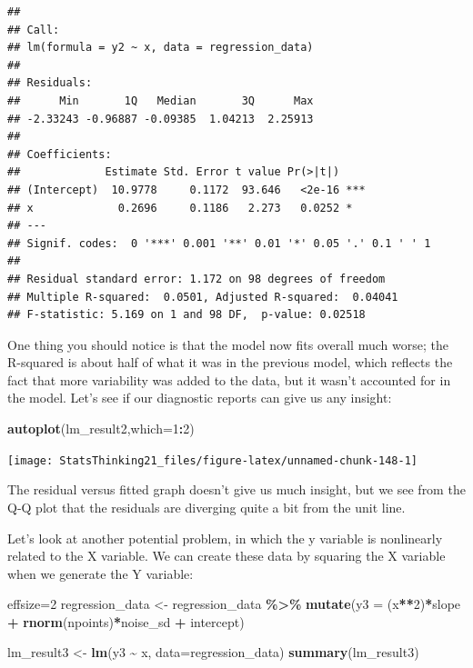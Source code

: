 \documentclass[
  12pt,
]{book}
\newenvironment{Shaded}{\begin{snugshade}}{\end{snugshade}}
\newcommand{\AttributeTok}[1]{\textcolor[rgb]{0.13,0.29,0.53}{#1}}
\newcommand{\DecValTok}[1]{\textcolor[rgb]{0.00,0.00,0.81}{#1}}
\newcommand{\FunctionTok}[1]{\textcolor[rgb]{0.13,0.29,0.53}{\textbf{#1}}}
\newcommand{\NormalTok}[1]{#1}
\newcommand{\OtherTok}[1]{\textcolor[rgb]{0.56,0.35,0.01}{#1}}
\newcommand{\SpecialCharTok}[1]{\textcolor[rgb]{0.81,0.36,0.00}{\textbf{#1}}}
\begin{document}
\begin{verbatim}
## 
## Call:
## lm(formula = y2 ~ x, data = regression_data)
## 
## Residuals:
##      Min       1Q   Median       3Q      Max 
## -2.33243 -0.96887 -0.09385  1.04213  2.25913 
## 
## Coefficients:
##             Estimate Std. Error t value Pr(>|t|)    
## (Intercept)  10.9778     0.1172  93.646   <2e-16 ***
## x             0.2696     0.1186   2.273   0.0252 *  
## ---
## Signif. codes:  0 '***' 0.001 '**' 0.01 '*' 0.05 '.' 0.1 ' ' 1
## 
## Residual standard error: 1.172 on 98 degrees of freedom
## Multiple R-squared:  0.0501, Adjusted R-squared:  0.04041 
## F-statistic: 5.169 on 1 and 98 DF,  p-value: 0.02518
\end{verbatim}

One thing you should notice is that the model now fits overall much worse; the R-squared is about half of what it was in the previous model, which reflects the fact that more variability was added to the data, but it wasn't accounted for in the model. Let's see if our diagnostic reports can give us any insight:

\begin{Shaded}
\begin{Highlighting}[]
\FunctionTok{autoplot}\NormalTok{(lm\_result2,}\AttributeTok{which=}\DecValTok{1}\SpecialCharTok{:}\DecValTok{2}\NormalTok{)}
\end{Highlighting}
\end{Shaded}

\texttt{[image: StatsThinking21\_files/figure-latex/unnamed-chunk-148-1]}

The residual versus fitted graph doesn't give us much insight, but we see from the Q-Q plot that the residuals are diverging quite a bit from the unit line.

Let's look at another potential problem, in which the y variable is nonlinearly related to the X variable. We can create these data by squaring the X variable when we generate the Y variable:

\begin{Shaded}
\begin{Highlighting}[]
\NormalTok{effsize}\OtherTok{=}\DecValTok{2}
\NormalTok{regression\_data }\OtherTok{\textless{}{-}}\NormalTok{ regression\_data }\SpecialCharTok{\%\textgreater{}\%}
  \FunctionTok{mutate}\NormalTok{(}\AttributeTok{y3 =}\NormalTok{ (x}\SpecialCharTok{**}\DecValTok{2}\NormalTok{)}\SpecialCharTok{*}\NormalTok{slope }\SpecialCharTok{+} \FunctionTok{rnorm}\NormalTok{(npoints)}\SpecialCharTok{*}\NormalTok{noise\_sd }\SpecialCharTok{+}\NormalTok{ intercept)}

\NormalTok{lm\_result3 }\OtherTok{\textless{}{-}} \FunctionTok{lm}\NormalTok{(y3 }\SpecialCharTok{\textasciitilde{}}\NormalTok{ x, }\AttributeTok{data=}\NormalTok{regression\_data)}
\FunctionTok{summary}\NormalTok{(lm\_result3)}
\end{Highlighting}
\end{Shaded}
\end{document}
